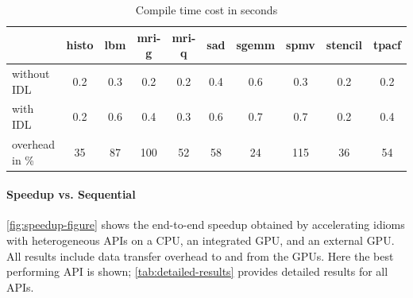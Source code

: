 \begin{table}[t]
  \begin{tabular}{lccccccccc}
  \toprule
  & \hspace{0.530mm}histo\hspace{0.53mm}
  & \hspace{0.530mm}lbm\hspace{0.530mm}
  & \hspace{0.530mm}mri-g\hspace{0.530mm}
  & \hspace{0.530mm}mri-q\hspace{0.530mm}
  & \hspace{0.530mm}sad\hspace{0.530mm}
  & \hspace{0.530mm}sgemm\hspace{0.530mm}
  & \hspace{0.530mm}spmv\hspace{0.530mm}
  & \hspace{0.530mm}stencil\hspace{0.530mm}
  & \hspace{0.530mm}tpacf\hspace{0.530mm} \\
  \midrule
without IDL    & 0.2 & 0.3 & 0.2 & 0.2 & 0.4 & 0.6 & 0.3 & 0.2 & 0.2 \\[0.25em]
with IDL       & 0.2 & 0.6 & 0.4 & 0.3 & 0.6 & 0.7 & 0.7 & 0.2 & 0.4 \\[0.75em]
overhead in \% &  35 &  87 & 100 &  52 &  58 &  24 & 115 &  36 &  54 \\
  \bottomrule
\end{tabular}

  \vspace{.1cm}
\caption{Compile time cost in seconds}
\label{tab:compiletimecost}
\end{table}
\addtolength{\tabcolsep}{+.3em}

\paragraph{Speedup vs. Sequential}
\autoref{fig:speedup-figure} shows the end-to-end speedup obtained by accelerating idioms with heterogeneous APIs on a CPU, an integrated GPU, and an external GPU.
All results include data transfer overhead to and from the GPUs.
Here the best performing API is shown;
\autoref{tab:detailed-results} provides detailed results  for all APIs. 

